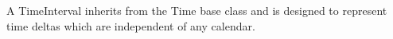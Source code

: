 
A TimeInterval inherits from the Time base class and is designed to represent
time deltas which are independent of any calendar.
